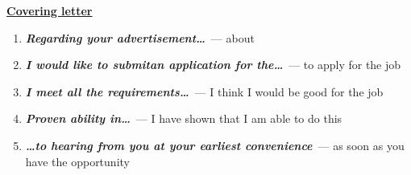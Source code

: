 \documentclass[10pt,a4paper]{article}
\begin{document}
\par\medskip\textbf{\underline{Covering letter}}
\begin{enumerate}
  \item \textit{\textbf{Regarding your advertisement\dots}}~--- about
  \item \textit{\textbf{I would like to submitan application for the\dots}}~--- to apply for the job
  \item \textit{\textbf{I meet all the requirements\dots}}~--- I think I would be good for the job
  \item \textit{\textbf{Proven ability in\dots}}~--- I have shown that I am able to do this
  \item \textit{\textbf{\dots to hearing from you at your earliest convenience}}~--- as soon as you have the opportunity
\end{enumerate}
\end{document}
